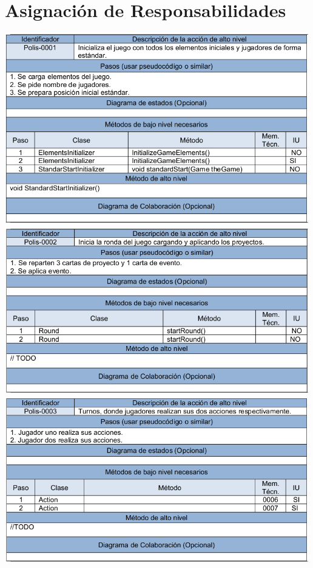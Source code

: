 \documentclass[11 pt]{book}
\begin{document}
	\section{Asignación de Responsabilidades}
		\begin{center}
			\includegraphics[width=500px]{responsabilities-allocation/iteration3/polis-0001.png}
			\includegraphics[width=500px]{responsabilities-allocation/iteration3/polis-0002.png}
			\includegraphics[width=500px]{responsabilities-allocation/iteration3/polis-0003.png}

\end{center}
\end{document}
